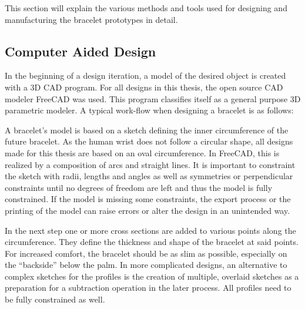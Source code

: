 This section will explain the various methods and tools used for designing and manufacturing the bracelet prototypes in detail.

\subsection{Computer Aided Design}
In the beginning of a design iteration, a model of the desired object is created with a 3D \ac{CAD} program. For all designs in this thesis, the open source \ac{CAD} modeler FreeCAD\cite{freecad} was used. This program classifies itself as a general purpose 3D parametric modeler. A typical work-flow when designing a bracelet is as follows:

A bracelet's model is based on a sketch defining the inner circumference of the future bracelet. As the human wrist does not follow a circular shape, all designs made for this thesis are based on an oval circumference. In FreeCAD, this is realized by a composition of arcs and straight lines. It is important to constraint the sketch with radii, lengths and angles as well as symmetries or perpendicular constraints until no degrees of freedom are left and thus the model is fully constrained. If the model is missing some constraints, the export process or the printing of the model can raise errors or alter the design in an unintended way.

In the next step one or more cross sections are added to various points along the circumference. They define the thickness and shape of the bracelet at said points. For increased comfort, the bracelet should be as slim as possible, especially on the ``backside'' below the palm. In more complicated designs, an alternative to complex sketches for the profiles is the creation of multiple, overlaid sketches as a preparation for a subtraction operation in the later process. All profiles need to be fully constrained as well.

